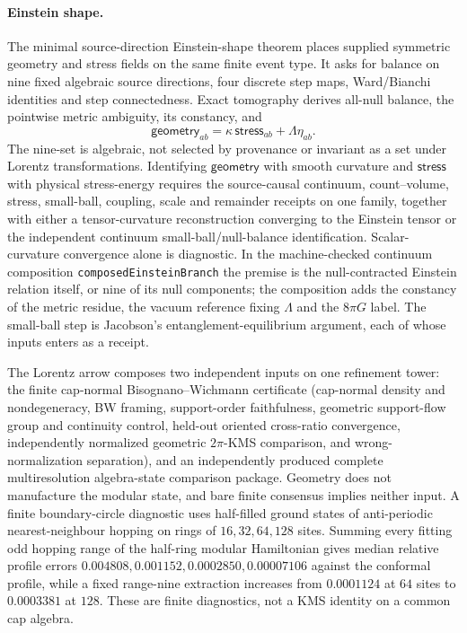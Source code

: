 \documentclass[11pt]{article}
\begin{document}
\paragraph{Einstein shape.}
The minimal source-direction Einstein-shape theorem places supplied symmetric
geometry and stress fields on the same finite event type. It asks for balance
on nine fixed algebraic source directions, four discrete step maps,
Ward/Bianchi identities and step connectedness. Exact tomography derives
all-null balance, the pointwise metric ambiguity, its constancy, and
\[
 \mathsf{geometry}_{ab}
   =\kappa\,\mathsf{stress}_{ab}+\Lambda\eta_{ab}.
\]
The nine-set is algebraic, not selected by provenance or invariant as a set
under Lorentz transformations. Identifying \(\mathsf{geometry}\) with smooth
curvature and \(\mathsf{stress}\) with physical stress-energy requires the
source-causal continuum, count--volume, stress, small-ball, coupling, scale
and remainder receipts on one family, together with either a tensor-curvature
reconstruction converging to the Einstein tensor or the independent continuum
small-ball/null-balance identification. Scalar-curvature convergence alone is
diagnostic. In the machine-checked continuum composition
\texttt{composedEinsteinBranch} the premise is the null-contracted Einstein
relation itself, or nine of its null components; the composition adds the
constancy of the metric residue, the vacuum reference fixing $\Lambda$ and the
$8\pi G$ label. The small-ball step is Jacobson's entanglement-equilibrium
argument, each of whose inputs enters as a receipt.

The Lorentz arrow composes two independent inputs on one refinement tower:
the finite cap-normal Bisognano--Wichmann certificate (cap-normal density and
nondegeneracy, BW framing, support-order faithfulness, geometric support-flow
group and continuity control, held-out oriented cross-ratio convergence,
independently normalized geometric \(2\pi\)-KMS comparison, and
wrong-normalization separation), and an independently produced complete
multiresolution algebra-state comparison package. Geometry does not
manufacture the modular state, and bare finite consensus implies neither
input. A finite boundary-circle diagnostic uses half-filled ground states of
anti-periodic nearest-neighbour hopping on rings of $16,32,64,128$ sites.
Summing every fitting odd hopping range of the half-ring modular Hamiltonian
gives median relative profile errors $0.004808,0.001152,0.0002850,0.00007106$
against the conformal profile, while a fixed range-nine extraction increases
from $0.0001124$ at $64$ sites to $0.0003381$ at $128$. These are finite
diagnostics, not a KMS identity on a common cap algebra.
\end{document}
